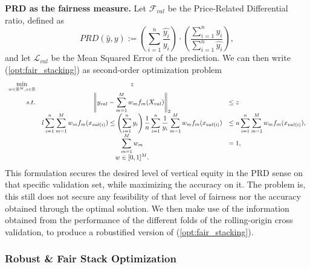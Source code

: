 \documentclass[11pt]{article}
\theoremstyle{plain}
\theoremstyle{definition}
\newcommand{\R}{\mathbb{R}}
\newcommand{\1}{\mathbf{1}}
\newcommand{\F}{\mathcal{F}}
\renewcommand{\L}{\mathcal{L}}
\renewcommand{\R}{\mathbb{R}}
\begin{document}
{\noindent \textbf{PRD as the fairness measure.} Let $\F_{val}$ be the Price-Related Differential ratio, defined as  $$PRD(\hat{y}, y):=\left(\sum_{i=1}^n \frac{\hat{y_i}}{y_i} \right)\cdot \left(\frac{\sum_{i=1}^n {y_i}}{\sum_{i=1}^n \hat{y_i}} \right),$$ and let $\L_{val}$ be the Mean Squared Error of the prediction. We can then write (\ref{opt:fair_stacking}) as second-order optimization problem 
\[
\everymath{\displaystyle}
    \begin{array}{rcl}
       \min_{w \in \R^M, z\in \R}  & z \\
        s.t. &  \left\| y_{val} - \sum_{m=1}^M w_m f_m(X_{val})  \right\|_2 &\leq z \\
        &l \sum_{i=1}^n \sum_{m=1}^M w_m f_m(x_{val(i)}) \leq \left( \sum_{i=1}^n y_i \right) \frac{1}{n}\sum_{i=1}^n \frac{1}{y_i} \sum_{m=1}^M w_m f_m(x_{val(i)})& \leq  u \sum_{i=1}^n\sum_{m=1}^M w_m f_m(x_{val(i)}),\\
        & \sum_{m=1}^M w_m& =1, \\
       &  w \in [0,1]^M.
    \end{array}
\]
This formulation secures the desired level of vertical equity in the PRD sense on that specific validation set, while maximizing the accuracy on it. The problem is, this still does not secure any feasibility of that level of fairness nor the accuracy obtained through the optimal solution. We then make use of the information obtained from the performance of the different folds of the rolling-origin cross validation, to produce a robustified version of (\ref{opt:fair_stacking}).


\subsubsection{Robust \& Fair Stack Optimization}

}
\end{document}
